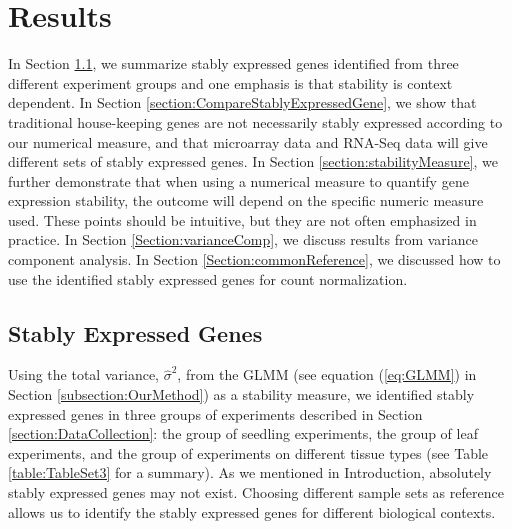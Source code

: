\documentclass[letterpaper,12pt]{article}
\begin{document}


\section{Results} \label{section:Results}
In Section \ref{section:stablyExpressedGene}, we summarize stably expressed genes identified from three
different experiment groups and one emphasis is that stability is
context dependent. In Section \ref{section:CompareStablyExpressedGene}, we show that traditional house-keeping
genes are not necessarily stably expressed according to our numerical measure, 
and that microarray data and RNA-Seq data will give different sets of stably
expressed genes.  In Section \ref{section:stabilityMeasure}, we further demonstrate that when using a
numerical measure to quantify gene expression stability, the outcome will
depend on the specific numeric measure used.  These points should be
intuitive, but they are not often emphasized in practice.  In Section
\ref{Section:varianceComp}, we discuss results from variance component analysis. In Section
\ref{Section:commonReference}, we discussed how to use the identified stably
expressed genes for count normalization.

\subsection{Stably Expressed Genes}\label{section:stablyExpressedGene}
Using the total variance, $\hat\sigma^2$, from the GLMM (see
equation (\ref{eq:GLMM}) in Section \ref{subsection:OurMethod}) as a
stability measure, we identified stably expressed genes in three groups of
experiments described in Section \ref{section:DataCollection}: the group of seedling
experiments, the group of leaf experiments, and the group of experiments on
different tissue types (see Table \ref{table:TableSet3} for a summary).
 As we mentioned in
Introduction, absolutely stably expressed genes may not exist.  Choosing
different sample sets as reference allows us to identify the stably expressed
genes for different biological contexts.
\end{document}
